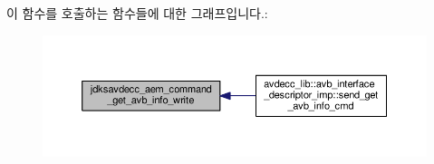 이 함수를 호출하는 함수들에 대한 그래프입니다.\+:
\nopagebreak
\begin{figure}[H]
\begin{center}
\leavevmode
\includegraphics[width=350pt]{group__command__get__avb__info_ga235313d7eff8881fed9a1f5d749a497f_icgraph}
\end{center}
\end{figure}


